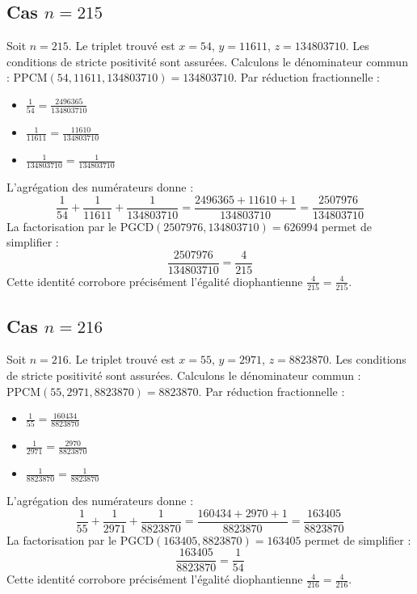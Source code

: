 \documentclass[11pt,a4paper]{article}
\begin{document}
\subsection{Cas $n = 215$}
Soit $n = 215$. Le triplet trouvé est $x = 54$, $y = 11611$, $z = 134803710$.
Les conditions de stricte positivité sont assurées.
Calculons le dénominateur commun : $\text{PPCM}(54, 11611, 134803710) = 134803710$.
Par réduction fractionnelle :
\begin{itemize}
    \item $\frac{1}{54} = \frac{2496365}{134803710}$
    \item $\frac{1}{11611} = \frac{11610}{134803710}$
    \item $\frac{1}{134803710} = \frac{1}{134803710}$
\end{itemize}
L'agrégation des numérateurs donne :
$$ \frac{1}{54} + \frac{1}{11611} + \frac{1}{134803710} = \frac{2496365 + 11610 + 1}{134803710} = \frac{2507976}{134803710} $$
La factorisation par le $\text{PGCD}(2507976, 134803710) = 626994$ permet de simplifier :
$$ \frac{2507976}{134803710} = \frac{4}{215} $$
Cette identité corrobore précisément l'égalité diophantienne $\frac{4}{215} = \frac{4}{215}$.

\subsection{Cas $n = 216$}
Soit $n = 216$. Le triplet trouvé est $x = 55$, $y = 2971$, $z = 8823870$.
Les conditions de stricte positivité sont assurées.
Calculons le dénominateur commun : $\text{PPCM}(55, 2971, 8823870) = 8823870$.
Par réduction fractionnelle :
\begin{itemize}
    \item $\frac{1}{55} = \frac{160434}{8823870}$
    \item $\frac{1}{2971} = \frac{2970}{8823870}$
    \item $\frac{1}{8823870} = \frac{1}{8823870}$
\end{itemize}
L'agrégation des numérateurs donne :
$$ \frac{1}{55} + \frac{1}{2971} + \frac{1}{8823870} = \frac{160434 + 2970 + 1}{8823870} = \frac{163405}{8823870} $$
La factorisation par le $\text{PGCD}(163405, 8823870) = 163405$ permet de simplifier :
$$ \frac{163405}{8823870} = \frac{1}{54} $$
Cette identité corrobore précisément l'égalité diophantienne $\frac{4}{216} = \frac{4}{216}$.
\end{document}
